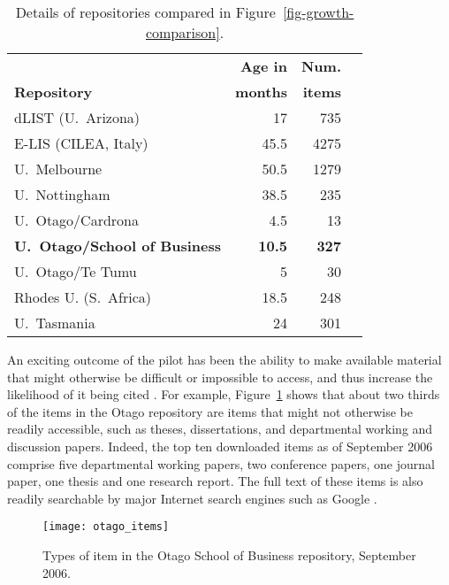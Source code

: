 \documentclass[12pt,pdftex,a4paper,titlepage]{article}
\begin{document}
\begin{table}
	\caption{Details of repositories compared in Figure~\ref{fig-growth-comparison}.}
	\label{tab-repositories}
	\begin{center}
		\begin{tabular}{lrrl}
													&	\textbf{Age in}	&	\textbf{Num.}	\\
			\textbf{Repository}						&	\textbf{months}	&	\textbf{items}	\\
			\hline
			dLIST (U.\ Arizona)						&	17				&	735	\\
			E-LIS (CILEA, Italy)					&	45.5			&	4275	\\
			U.\ Melbourne							&	50.5			&	1279	\\
			U.\ Nottingham							&	38.5			&	235	\\
			U.\ Otago/Cardrona						&	4.5				&	13	\\
			\textbf{U.\ Otago/School of Business}	&	\textbf{10.5}	&	\textbf{327}	\\
			U.\ Otago/Te Tumu						&	5				&	30	\\
			Rhodes U. (S.\ Africa)					&	18.5			&	248	\\
			U.\ Tasmania							&	24				&	301	\\
		\end{tabular}
	\end{center}
\end{table}


An exciting outcome of the pilot has been the ability to make  available material that might otherwise be difficult or impossible to access, and thus increase the likelihood of it being cited \cite{Harn-S-2005-research,Hajj-C-2005-citation}. For example, Figure~\ref{fig-item-types} shows that about two thirds of the items in the Otago repository are items that might not otherwise be readily accessible, such as theses, dissertations, and departmental working and discussion papers. Indeed, the top ten downloaded items as of September 2006 comprise five departmental working papers, two conference papers, one journal paper, one thesis and one research report. The full text of these items is also readily searchable by major Internet search engines such as Google \cite{Sale-A-2006-OAchapter}.


\begin{figure}
	\centering
	\texttt{[image: otago\_items]}
	\caption{Types of item in the Otago School of Business repository, September 2006.}
	\label{fig-item-types}
\end{figure}
\end{document}
